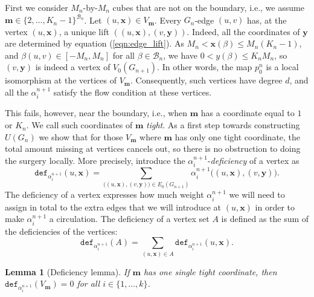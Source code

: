 \documentclass[10pt]{article}
\theoremstyle{plain}
\newtheorem{lemma}{Lemma}[section]
\theoremstyle{remark}
\newcommand{\1}{\mathbbm{1}}
\numberwithin{equation}{section}
\begin{document}
First we consider $M_n$-by-$M_n$ cubes that are not on the boundary, i.e., we assume $\mathbf{m} \in \{2,\ldots,K_n-1\}^{\mathcal{B}_n}$. Let $(u, \mathbf{x}) \in V_{\mathbf{m}}$. Every $G_{n}$-edge $(u,v)$ has, at the vertex $(u, \mathbf{x})$, a unique lift $((u, \mathbf{x}),(v,\mathbf{y}))$. Indeed, all the coordinates of $\mathbf{y}$ are determined by equation (\ref{eqn:edge_lift}). As $M_n < \mathbf{x}(\beta) \leq M_n(K_n-1)$, and  $\beta(u,v) \in [-M_n,M_n]$ for all $\beta \in \mathcal{B}_n$, we have $0 < y(\beta) \leq K_nM_n$, so $(v,\mathbf{y})$ is indeed a vertex of $V_0(G_{n+1})$. In other words, the map $p_0^n$ is a local isomorphism at the vertices of $V_{\mathbf{m}}$. Consequently, such vertices have degree $d$, and all the $\alpha^{n+1}_i$ satisfy the flow condition at these vertices. 

This fails, however, near the boundary, i.e., when $\mathbf{m}$ has a coordinate equal to $1$ or $K_{n}$. We call such coordinates of $\mathbf{m}$ \emph{tight}. As a first step towards constructing $U(G_n)$ we show that for those $V_{\mathbf{m}}$ where $\mathbf{m}$ has only one tight coordinate, the total amount missing at vertices cancels out, so there is no obstruction to doing the surgery locally. More precisely, introduce the $\alpha^{n+1}_i$-\emph{deficiency} of a vertex as
\[\texttt{def}_{\alpha^{n+1}_i}(u,\mathbf{x}) = \sum_{\big((u, \mathbf{x}),(v,\mathbf{y})\big) \in E_0(G_{n+1})} \alpha^{n+1}_i \big((u,\mathbf{x}),(v, \mathbf{y})\big).\] The deficiency of a vertex expresses how much weight $\alpha^{n+1}_i$ we will need to assign in total to the extra edges that we will introduce at $(u,\mathbf{x})$ in order to make $\alpha^{n+1}_i$ a circulation. The deficiency of a vertex set $A$ is defined as the sum of the deficiencies of the vertices: \[\texttt{def}_{\alpha^{n+1}_i}(A) = \sum_{(u,\mathbf{x}) \in A} \texttt{def}_{\alpha^{n+1}_i}(u,\mathbf{x}).\]

\begin{lemma}[Deficiency lemma] \label{lemma:deficiency}
    If $\textbf{m}$ has one single tight coordinate, then $\texttt{def}_{\alpha^{n+1}_i}(V_{\mathbf{m}}) =0$ for all $i \in \{1,\ldots, k\}$. 
\end{lemma}
\end{document}
